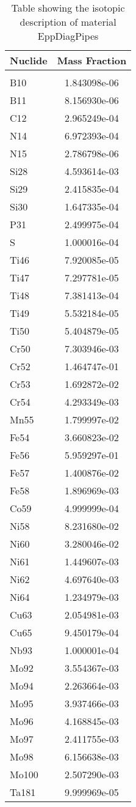 \begin{centering}
\begin{table}[ht!]
\begin{tabular}{l | c}
\hline
Nuclide & Mass Fraction\\
\hline
\\
B10 & 1.843098e-06\\
B11 & 8.156930e-06\\
C12 & 2.965249e-04\\
N14 & 6.972393e-04\\
N15 & 2.786798e-06\\
Si28 & 4.593614e-03\\
Si29 & 2.415835e-04\\
Si30 & 1.647335e-04\\
P31 & 2.499975e-04\\
S & 1.000016e-04\\
Ti46 & 7.920085e-05\\
Ti47 & 7.297781e-05\\
Ti48 & 7.381413e-04\\
Ti49 & 5.532184e-05\\
Ti50 & 5.404879e-05\\
Cr50 & 7.303946e-03\\
Cr52 & 1.464747e-01\\
Cr53 & 1.692872e-02\\
Cr54 & 4.293349e-03\\
Mn55 & 1.799997e-02\\
Fe54 & 3.660823e-02\\
Fe56 & 5.959297e-01\\
Fe57 & 1.400876e-02\\
Fe58 & 1.896969e-03\\
Co59 & 4.999999e-04\\
Ni58 & 8.231680e-02\\
Ni60 & 3.280046e-02\\
Ni61 & 1.449607e-03\\
Ni62 & 4.697640e-03\\
Ni64 & 1.234979e-03\\
Cu63 & 2.054981e-03\\
Cu65 & 9.450179e-04\\
Nb93 & 1.000001e-04\\
Mo92 & 3.554367e-03\\
Mo94 & 2.263664e-03\\
Mo95 & 3.937466e-03\\
Mo96 & 4.168845e-03\\
Mo97 & 2.411755e-03\\
Mo98 & 6.156638e-03\\
Mo100 & 2.507290e-03\\
Ta181 & 9.999969e-05
\end{tabular}
\caption{Table showing the isotopic description of material EppDiagPipes}
\label{table:material_EppDiagPipes}
\end{table}\clearpage


\end{centering}
